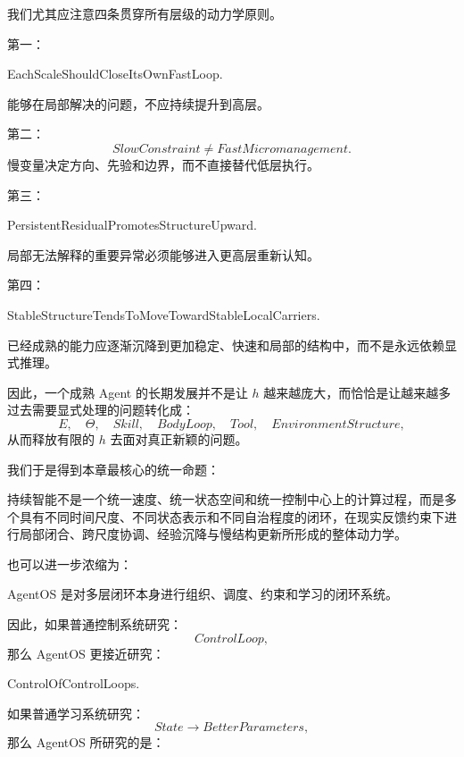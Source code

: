 我们尤其应注意四条贯穿所有层级的动力学原则。

第一：
\begin{statementbox}
EachScaleShouldCloseItsOwnFastLoop.
\end{statementbox}
能够在局部解决的问题，不应持续提升到高层。

第二：
\[
\boxed{
SlowConstraint\neq FastMicromanagement.
}
\]
慢变量决定方向、先验和边界，而不直接替代低层执行。

第三：
\begin{statementbox}
PersistentResidualPromotesStructureUpward.
\end{statementbox}
局部无法解释的重要异常必须能够进入更高层重新认知。

第四：
\begin{statementbox}
StableStructureTendsToMoveTowardStableLocalCarriers.
\end{statementbox}
已经成熟的能力应逐渐沉降到更加稳定、快速和局部的结构中，而不是永远依赖显式推理。

因此，一个成熟 Agent 的长期发展并不是让 $h$ 越来越庞大，而恰恰是让越来越多过去需要显式处理的问题转化成：
\[
E,
\quad
\Theta,
\quad
Skill,
\quad
BodyLoop,
\quad
Tool,
\quad
EnvironmentStructure,
\]
从而释放有限的 $h$ 去面对真正新颖的问题。

我们于是得到本章最核心的统一命题：
\begin{proposition*}
持续智能不是一个统一速度、统一状态空间和统一控制中心上的计算过程，而是多个具有不同时间尺度、不同状态表示和不同自治程度的闭环，在现实反馈约束下进行局部闭合、跨尺度协调、经验沉降与慢结构更新所形成的整体动力学。
\end{proposition*}

也可以进一步浓缩为：
\begin{conclusion}
AgentOS 是对多层闭环本身进行组织、调度、约束和学习的闭环系统。
\end{conclusion}

因此，如果普通控制系统研究：
\[
ControlLoop,
\]
那么 AgentOS 更接近研究：
\begin{statementbox}
ControlOfControlLoops.
\end{statementbox}

如果普通学习系统研究：
\[
State\rightarrow BetterParameters,
\]
那么 AgentOS 所研究的是：
\begin{statementbox}
\centering
{}
\end{statementbox}

